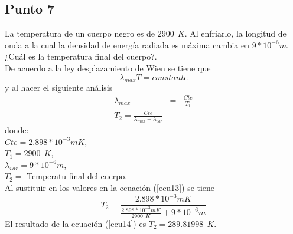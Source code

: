 \documentclass[11pt,graphicx,caption,rotating]{article}
\begin{document}
\subsection{Punto 7}
\noindent
La temperatura de un cuerpo negro es de $2900\ \ K$. Al enfriarlo, la longitud de onda a la cual la densidad de energía radiada es máxima cambia en $9 * 10^{-6}m$. ¿Cuál es la temperatura final del cuerpo?.\[\]
\noindent
De acuerdo a la ley desplazamiento de Wien se tiene que 
\begin{equation}
 \lambda _{max} T= constante
\label{ecu12}
\end{equation}
\noindent
y al hacer el siguiente análisis
\begin{eqnarray}
 \lambda _{max} & = &\frac{Cte}{T_1} \nonumber\\
 T_2 =\frac{Cte}{\lambda _{max} + \lambda _{var}} \label{ecu13}
\end{eqnarray}
\noindent
donde:\\
$Cte = 2.898 * 10^{-3}mK$,\\
$T_1 = 2900\ \ K$,\\
$\lambda _{var} = 9 * 10^{-6}m$,\\
$T_2 = $ Temperatu final del cuerpo.\\
Al sustituir en los valores en la ecuación (\ref{ecu13}) se tiene 
\begin{equation}
 T_2 =\frac{2.898 * 10^{-3}mK}{\frac{2.898 * 10^{-3}mK}{2900\ \ K} + 9 * 10^{-6}m}
\label{ecu14}
\end{equation}
\noindent
El resultado de la ecuación (\ref{ecu14}) es $T_2 = 289.81998\ \ K$. 
\end{document}
